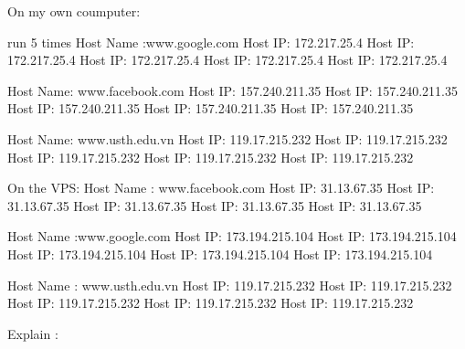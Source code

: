On my own coumputer:


run 5 times
Host Name :www.google.com 
Host IP: 172.217.25.4
Host IP: 172.217.25.4
Host IP: 172.217.25.4
Host IP: 172.217.25.4
Host IP: 172.217.25.4


Host Name: www.facebook.com
Host IP: 157.240.211.35
Host IP: 157.240.211.35
Host IP: 157.240.211.35
Host IP: 157.240.211.35
Host IP: 157.240.211.35


Host Name:  www.usth.edu.vn
Host IP: 119.17.215.232
Host IP: 119.17.215.232
Host IP: 119.17.215.232
Host IP: 119.17.215.232
Host IP: 119.17.215.232


On the VPS:
Host Name : www.facebook.com
Host IP: 31.13.67.35
Host IP: 31.13.67.35
Host IP: 31.13.67.35
Host IP: 31.13.67.35
Host IP: 31.13.67.35

Host Name :www.google.com
Host IP: 173.194.215.104
Host IP: 173.194.215.104
Host IP: 173.194.215.104
Host IP: 173.194.215.104
Host IP: 173.194.215.104

Host Name : www.usth.edu.vn
Host IP: 119.17.215.232
Host IP: 119.17.215.232
Host IP: 119.17.215.232
Host IP: 119.17.215.232
Host IP: 119.17.215.232

Explain :
